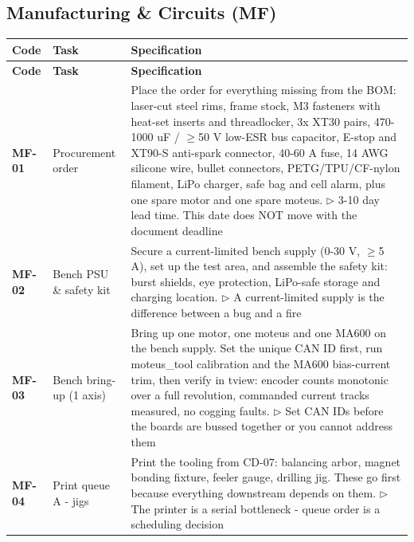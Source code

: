 \subsection{Manufacturing \& Circuits (MF)}
{\small
\setlength{\tabcolsep}{4pt}%
\begin{longtable}{@{}L{1.1cm} L{3.0cm} L{11.0cm}@{}}
\toprule
\textbf{Code} & \textbf{Task} & \textbf{Specification} \\
\midrule\endfirsthead
\toprule
\textbf{Code} & \textbf{Task} & \textbf{Specification} \\
\midrule\endhead
\bottomrule\endfoot
\textbf{MF-01} & Procurement order & Place the order for everything missing from the BOM: laser-cut steel rims, frame stock, M3 fasteners with heat-set inserts and threadlocker, 3x XT30 pairs, 470-1000 uF / $\geq$50 V low-ESR bus capacitor, E-stop and XT90-S anti-spark connector, 40-60 A fuse, 14 AWG silicone wire, bullet connectors, PETG/TPU/CF-nylon filament, LiPo charger, safe bag and cell alarm, plus one spare motor and one spare moteus. \newline\textcolor{p0col}{\footnotesize$\triangleright$ 3-10 day lead time. This date does NOT move with the document deadline} \\[2pt]
\textbf{MF-02} & Bench PSU \& safety kit & Secure a current-limited bench supply (0-30 V, $\geq$5 A), set up the test area, and assemble the safety kit: burst shields, eye protection, LiPo-safe storage and charging location. \newline\textcolor{p0col}{\footnotesize$\triangleright$ A current-limited supply is the difference between a bug and a fire} \\[2pt]
\textbf{MF-03} & Bench bring-up (1 axis) & Bring up one motor, one moteus and one MA600 on the bench supply. Set the unique CAN ID first, run moteus\_tool calibration and the MA600 bias-current trim, then verify in tview: encoder counts monotonic over a full revolution, commanded current tracks measured, no cogging faults. \newline\textcolor{p0col}{\footnotesize$\triangleright$ Set CAN IDs before the boards are bussed together or you cannot address them} \\[2pt]
\textbf{MF-04} & Print queue A - jigs & Print the tooling from CD-07: balancing arbor, magnet bonding fixture, feeler gauge, drilling jig. These go first because everything downstream depends on them. \newline\textcolor{p0col}{\footnotesize$\triangleright$ The printer is a serial bottleneck - queue order is a scheduling decision} \\[2pt]

\end{longtable}}
